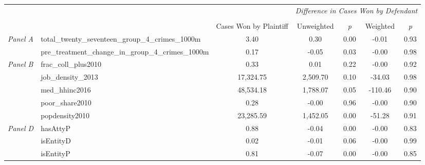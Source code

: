 \begin{tabular}{llccccc}
\toprule
 &  & \textit{} & \multicolumn{4}{c}{\textit{Difference in Cases Won by Defendant}} \\
\cline{4-7}
\\
 &  & Cases Won by Plaintiff & Unweighted & \emph{p} & Weighted & \emph{p} \\
\midrule
\multirow[c]{2}{3cm}{\textit{Panel A}} & total_twenty_seventeen_group_4_crimes_1000m & 3.40 & 0.30 & 0.00 & -0.01 & 0.93 \\
 & pre_treatment_change_in_group_4_crimes_1000m & 0.17 & -0.05 & 0.03 & -0.00 & 0.98 \\
\cline{1-7}
\multirow[c]{5}{3cm}{\textit{Panel B}} & frac_coll_plus2010 & 0.33 & 0.01 & 0.22 & -0.00 & 0.92 \\
 & job_density_2013 & 17,324.75 & 2,509.70 & 0.10 & -34.03 & 0.98 \\
 & med_hhinc2016 & 48,534.18 & 1,788.07 & 0.05 & -110.46 & 0.90 \\
 & poor_share2010 & 0.28 & -0.00 & 0.96 & -0.00 & 0.90 \\
 & popdensity2010 & 23,285.59 & 1,452.05 & 0.00 & -51.28 & 0.91 \\
\cline{1-7}
\multirow[c]{3}{3cm}{\textit{Panel D}} & hasAttyP & 0.88 & -0.04 & 0.00 & -0.00 & 0.83 \\
 & isEntityD & 0.02 & -0.01 & 0.06 & -0.00 & 0.99 \\
 & isEntityP & 0.81 & -0.07 & 0.00 & -0.00 & 0.85 \\
\cline{1-7}
\bottomrule
\end{tabular}
